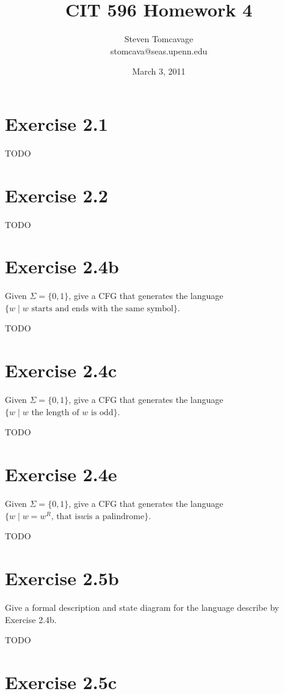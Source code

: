 \documentclass{article}
\title{CIT 596 Homework 4}
\author{Steven Tomcavage\\stomcava@seas.upenn.edu}
\date{March 3, 2011}
\newcommand{\where}{\mid}
\begin{document}
\maketitle

\section{Exercise 2.1}

TODO

\section{Exercise 2.2}

TODO

\section{Exercise 2.4b}

Given $\Sigma = \{0, 1\}$, give a CFG that generates the language $\{ w \where
w \text{ starts and ends with the same symbol} \}$.

TODO

\section{Exercise 2.4c}

Given $\Sigma = \{0, 1\}$, give a CFG that generates the language $\{ w \where
w \text{ the length of } w \text{ is odd} \}$.

TODO

\section{Exercise 2.4e}

Given $\Sigma = \{0, 1\}$, give a CFG that generates the language $\{ w \where
w = w^R \text{, that is} w \text{is a palindrome} \}$.

TODO

\section{Exercise 2.5b}

Give a formal description and state diagram for the language describe by
Exercise 2.4b.

TODO

\section{Exercise 2.5c}
\end{document}
